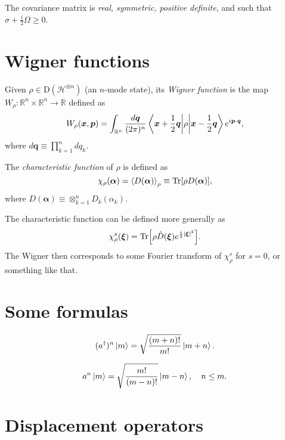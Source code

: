 \documentclass[12pt]{report}
\newcommand{\RR}{\mathbb{R}}
\newcommand{\bs}[1]{\boldsymbol{#1}}
\newcommand{\calH}{{\mathcal{H}}}
\newcommand{\rmD}{{\mathrm{D}}}
\begin{document}
\begin{prop}
	The covariance matrix is \emph{real, symmetric, positive definite}, and such that $\sigma+\frac{i}{2}\Omega\ge0$.
\end{prop}

\section{Wigner functions}

\begin{defn}
	Given $\rho\in\rmD(\calH^{\otimes n})$ (an $n$-mode state), its \emph{Wigner function} is the map $W_\rho:\RR^{n}\times\RR^n\to \RR$ defined as
	\begin{equation}
		W_\rho(\bs x,\bs p)
		= \int_{\RR^n} \frac{d\bs q}{(2\pi)^n}
		\mel{\bs x+\frac12\bs q}{\rho}{\bs x-\frac12 \bs q}
		e^{i \bs p\cdot\bs q},
	\end{equation}
	where $d\bs q\equiv \prod_{k=1}^n dq_k$.
\end{defn}

\begin{defn}
	The \emph{characteristic function} of $\rho$ is defined as
	\begin{equation}
		\chi_\rho(\bs\alpha)
		= \expval{D(\bs\alpha)}_\rho
		\equiv \Tr[\rho D(\bs\alpha)],
	\end{equation}
	where $D(\bs\alpha)\equiv \otimes_{k=1}^n D_k(\alpha_k)$.
\end{defn}

The characteristic function can be defined more generally as
\begin{equation}
	\chi_\rho^s(\bs\xi) = \Tr[\rho \hat D(\bs\xi) e^{\frac{s}{2}|\bs\xi|^2}].
\end{equation}
The Wigner then corresponds to some Fourier transform of $\chi_\rho^s$ for $s=0$, or something like that.

\section{Some formulas}

\begin{equation}
	(a^\dagger)^n \ket m 
	= \sqrt{\frac{(m+n)!}{m!}} \ket{m+n}.
\end{equation}

\begin{equation}
	a^n \ket m = \sqrt{\frac{m!}{(m-n)!}} \ket{m-n},\quad n\le m.
\end{equation}

\section{Displacement operators}
\end{document}
